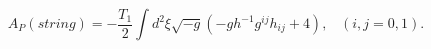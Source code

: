 \begin{equation}
A_{P}(string)=-\frac{T_1}{2}\int d^{2}{\xi}\sqrt{-g}\left(-gh^{-1}
g^{ij}h_{ij}+4\right),\hspace{10pt}(i,j=0,1).
\end{equation}

